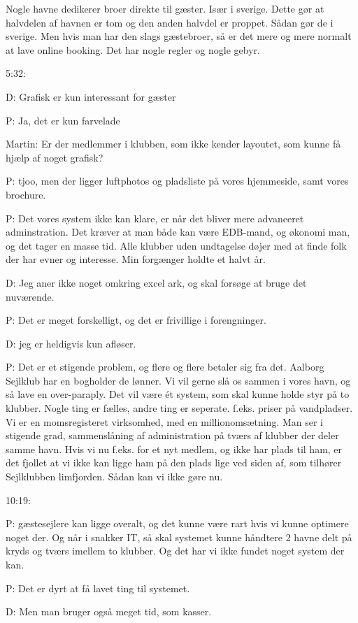 Nogle havne dedikerer broer direkte til gæster. Især i sverige. Dette gør at halvdelen af havnen er tom og den anden halvdel er proppet. Sådan gør de i sverige. Men hvis man har den slags gæstebroer, så er det mere og mere normalt at lave online booking. Det har nogle regler og nogle gebyr.

5:32:

D: Grafisk er kun interessant for gæster

P: Ja, det er kun farvelade

Martin: Er der medlemmer i klubben, som ikke kender layoutet, som kunne få hjælp af noget grafisk?

P: tjoo, men der ligger luftphotos og pladsliste på vores hjemmeside, samt vores brochure.

P: Det vores system ikke kan klare, er når det bliver mere advanceret adminstration. Det kræver at man både kan være EDB-mand, og økonomi man, og det tager en masse tid. Alle klubber uden undtagelse døjer med at finde folk der har evner og interesse. Min forgænger holdte et halvt år.

D: Jeg aner ikke noget omkring excel ark, og skal forsøge at bruge det nuværende.

P: Det er meget forskelligt, og det er frivillige i forengninger.

D: jeg er heldigvis kun afløser.

P: Det er et stigende problem, og flere og flere betaler sig fra det. Aalborg Sejlklub har en bogholder de lønner. Vi vil gerne slå os sammen i vores havn, og så lave en over-paraply. Det vil være ét system, som skal kunne holde styr på to klubber. Nogle ting er fælles, andre ting er seperate. f.eks. priser på vandpladser. Vi er en momsregisteret virksomhed, med en millionomsætning. Man ser i stigende grad, sammenslåning af administration på tværs af klubber der deler samme havn. Hvis vi nu f.eks. for et nyt medlem, og ikke har plads til ham, er det fjollet at vi ikke kan ligge ham på den plads lige ved siden af, som tilhører Sejlklubben limfjorden. Sådan kan vi ikke gøre nu.

10:19:

P: gæstesejlere kan ligge overalt, og det kunne være rart hvis vi kunne optimere noget der. Og når i snakker IT, så skal systemet kunne håndtere 2 havne delt på kryds og tværs imellem to klubber. Og det har vi ikke fundet noget system der kan.

P: Det er dyrt at få lavet ting til systemet.

D: Men man bruger også meget tid, som kasser.


